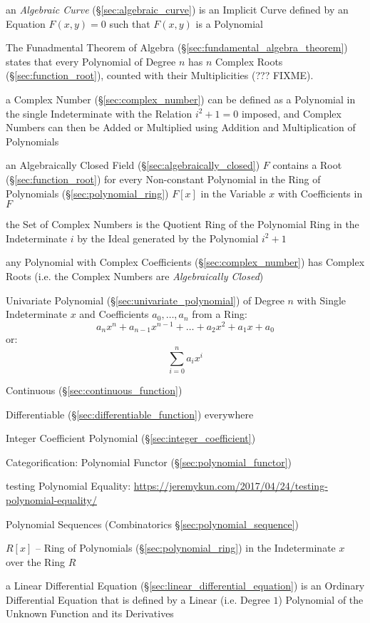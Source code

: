 \fist an \emph{Algebraic Curve} (\S\ref{sec:algebraic_curve}) is an Implicit
Curve defined by an Equation $F(x,y) = 0$ such that $F(x,y)$ is a Polynomial

The Funadmental Theorem of Algebra (\S\ref{sec:fundamental_algebra_theorem})
states that every Polynomial of Degree $n$ has $n$ Complex Roots
(\S\ref{sec:function_root}), counted with their Multiplicities (??? FIXME).

a Complex Number (\S\ref{sec:complex_number}) can be defined as a Polynomial in
the single Indeterminate with the Relation $i^2 + 1 = 0$ imposed, and Complex
Numbers can then be Added or Multiplied using Addition and Multiplication of
Polynomials

an Algebraically Closed Field (\S\ref{sec:algebraically_closed}) $F$ contains a
Root (\S\ref{sec:function_root}) for every Non-constant Polynomial in the Ring
of Polynomials (\S\ref{sec:polynomial_ring}) $F[x]$ in the Variable $x$ with
Coefficients in $F$

the Set of Complex Numbers is the Quotient Ring of the Polynomial Ring in the
Indeterminate $i$ by the Ideal generated by the Polynomial $i^2 + 1$

any Polynomial with Complex Coefficients (\S\ref{sec:complex_number}) has
Complex Roots (i.e. the Complex Numbers are \emph{Algebraically Closed})

Univariate Polynomial (\S\ref{sec:univariate_polynomial}) of Degree
$n$ with Single Indeterminate $x$ and Coefficients $a_0, \ldots, a_n$
from a Ring:
\[
  a_n x^n + a_{n-1} x^{n-1} + \ldots + a_2 x^2 + a_1 x + a_0
\]
or:
\[
  \sum_{i=0}^n a_i x^i
\]

Continuous (\S\ref{sec:continuous_function})

Differentiable (\S\ref{sec:differentiable_function}) everywhere

Integer Coefficient Polynomial (\S\ref{sec:integer_coefficient})

Categorification: Polynomial Functor (\S\ref{sec:polynomial_functor})

testing Polynomial Equality:
\url{https://jeremykun.com/2017/04/24/testing-polynomial-equality/}

\fist Polynomial Sequences (Combinatorics \S\ref{sec:polynomial_sequence})

$R[x]$ -- Ring of Polynomials (\S\ref{sec:polynomial_ring}) in the
Indeterminate $x$ over the Ring $R$

a Linear Differential Equation (\S\ref{sec:linear_differential_equation}) is an
Ordinary Differential Equation that is defined by a Linear (i.e. Degree $1$)
Polynomial of the Unknown Function and its Derivatives



